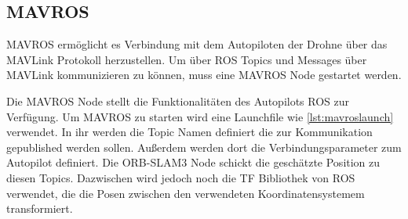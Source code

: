 \subsection{MAVROS}

MAVROS ermöglicht es Verbindung mit dem Autopiloten der Drohne über das MAVLink Protokoll herzustellen. Um über ROS Topics und Messages über MAVLink kommunizieren zu können, muss eine MAVROS Node gestartet werden.

Die MAVROS Node stellt die Funktionalitäten des Autopilots \ac{ROS} zur Verfügung. Um MAVROS zu starten wird eine Launchfile wie \ref{lst:mavroslaunch} verwendet. In ihr werden die Topic Namen definiert die zur Kommunikation gepublished werden sollen. Außerdem werden dort die Verbindungsparameter zum Autopilot definiert. Die ORB-SLAM3 Node schickt die geschätzte Position zu diesen Topics. Dazwischen wird jedoch noch die \ac{TF} Bibliothek von \ac{ROS} verwendet, die die Posen zwischen den verwendeten Koordinatensystemem transformiert. 



